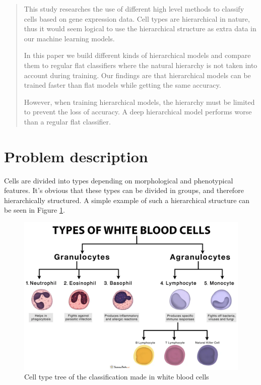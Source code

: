 \documentclass{article}
\begin{document}
\begin{abstract}
This study researches the use of different high level methods to classify cells based on gene expression data.
Cell types are hierarchical in nature, thus it would seem logical to use the hierarchical structure as extra data in our machine learning models. 

In this paper we build different kinds of hierarchical models and compare them to regular flat classifiers where the natural hierarchy is not taken into account during training. Our findings are that hierarchical models can be trained faster than flat models while getting the same accuracy. 

However, when training hierarchical models, the hierarchy must be limited to prevent the loss of accuracy. A deep hierarchical model performs worse than a regular flat classifier.
\end{abstract}

\section{Problem description}

Cells are divided into types depending on morphological and phenotypical features.
It's obvious that these types can be divided in groups, and therefore hierarchically structured.
A simple example of such a hierarchical structure can be seen in Figure \ref{cell-hyr}.

\begin{figure}[ht]
\vskip 0.2in
\begin{center}
\centerline{\includegraphics[width=\columnwidth]{images/cell-hyr.png}}
\caption{Cell type tree of the classification made in white blood cells \cite{cell-hyr}}
\label{cell-hyr}
\end{center}
\vskip -0.2in
\end{figure}
\end{document}
